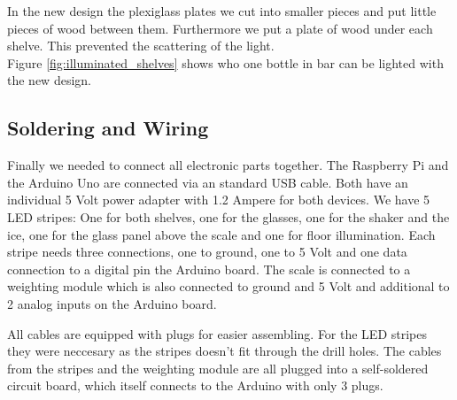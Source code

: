 \documentclass{acm_proc_article-sp}
\begin{document}
In the new design the plexiglass plates we cut into smaller pieces and put little pieces of wood between them. Furthermore we put a plate of wood under each shelve. This prevented the scattering of the light.\\
Figure \ref{fig:illuminated_shelves} shows who one bottle in bar can be lighted with the new design.

\subsection{Soldering and Wiring}
Finally we needed to connect all electronic parts together. The Raspberry Pi and the Arduino Uno are connected via an standard USB cable. Both have an individual 5 Volt power adapter with 1.2 Ampere for both devices. We have 5 LED stripes: One for both shelves, one for the glasses, one for the shaker and the ice, one for the glass panel above the scale and one for floor illumination. Each stripe needs three connections, one to ground, one to 5 Volt and one data connection to a digital pin the Arduino board. The scale is connected to a weighting module which is also connected to ground and 5 Volt and additional to 2 analog inputs on the Arduino board.


\begin{minipage}{\linewidth}%
  \label{fig:fritzing}
\end{minipage}

All cables are equipped with plugs for easier assembling. For the LED stripes they were neccesary as the stripes doesn't fit through the drill holes. The cables from the stripes and the weighting module are all plugged into a self-soldered circuit board, which itself connects to the Arduino with only 3 plugs. 
\end{document}
